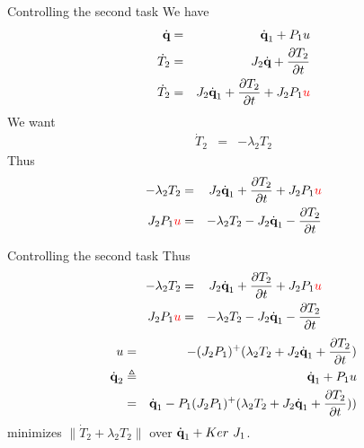 %
%

\begin{frame} {Controlling the second task}
  We have
  \begin{eqnarray*}
    \dot{\textbf{q}} &=& \dot{\textbf{q}}_1 + P_1 u\\
    \dot{T}_2 &=& J_2\dot{\textbf{q}} + \frac{\partial T_2}{\partial t}\\
    \dot{T}_2 &=& J_2 \dot{\textbf{q}}_1 + \frac{\partial T_2}{\partial t} + J_2 P_1 {\color{red}u}
  \end{eqnarray*}
  \pause
  We want
  \begin{eqnarray*}
    \dot{T}_2 &=&  - \lambda_2 T_2
  \end{eqnarray*}
  \pause
  Thus
  \begin{eqnarray*}
    - \lambda_2 T_2 &=& J_2 \dot{\textbf{q}}_1 + \frac{\partial T_2}{\partial t} + J_2 P_1 {\color{red}u} \\
    J_2 P_1 {\color{red}u} &=& - \lambda_2 T_2 - J_2 \dot{\textbf{q}}_1 - \frac{\partial T_2}{\partial t}
  \end{eqnarray*}
\end{frame}

%
%

\begin{frame} {Controlling the second task}
  Thus
  \begin{eqnarray*}
    - \lambda_2 T_2 &=& J_2 \dot{\textbf{q}}_1 + \frac{\partial T_2}{\partial t} + J_2 P_1 {\color{red}u} \\
    J_2 P_1 {\color{red}u} &=& - \lambda_2 T_2 - J_2 \dot{\textbf{q}}_1 - \frac{\partial T_2}{\partial t}\\
  \end{eqnarray*}
  \pause
  \begin{eqnarray*}
    u &=& -(J_2P_1)^+(\lambda_2 T_2 + J_2 \dot{\textbf{q}}_1 + \frac{\partial T_2}{\partial t})\\
    \dot  {\textbf{q}}_2 &\triangleq& \dot{\textbf{q}}_1 + P_1 u\\
&=& \dot{\textbf{q}}_1 - P_1(J_2P_1)^+(\lambda_2 T_2 + J_2 \dot{\textbf{q}}_1 + \frac{\partial T_2}{\partial t})) \\
  \end{eqnarray*}
  minimizes $\|\dot{T}_2 + \lambda_2 T_2\|$ over $\dot{\textbf{q}}_1 + Ker\ J_1$.
\end{frame}

%
%

